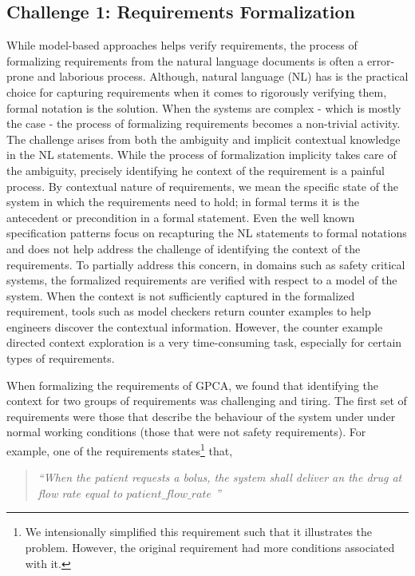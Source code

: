 \subsection{Challenge 1: Requirements Formalization}

While model-based approaches helps verify requirements, the process of formalizing requirements from the natural language documents is often a error-prone and laborious process. Although, natural language (NL) has is the practical choice for capturing requirements when it comes to rigorously verifying them, formal notation is the solution. When the systems are complex - which is mostly the case - the process of formalizing requirements becomes a non-trivial activity. The challenge arises from both the ambiguity and implicit contextual knowledge in the NL statements. While the process of formalization implicity takes care of the ambiguity, precisely identifying he context of the requirement is a painful process. By contextual nature of requirements, we mean the specific state of the system in which the requirements need to hold; in formal terms it is the antecedent or precondition in a formal statement. Even the well known specification patterns focus on recapturing the NL statements to formal notations and does not help address the challenge of identifying the context of the requirements. To partially address this concern, in domains such as safety critical systems, the formalized requirements are verified with respect to a model of the system. When the context is not sufficiently captured in the formalized requirement, tools such as model checkers return counter examples to help engineers discover the contextual information. However, the counter example directed context exploration is a very time-consuming task, especially for certain types of requirements.

When formalizing the requirements of GPCA, we found that identifying the context for two groups of requirements was challenging and tiring. The first set of requirements were those that describe the behaviour of the system under under normal working conditions (those that were not safety requirements). For example, one of the requirements states\footnote{\scriptsize{We intensionally simplified this requirement such that it illustrates the problem. However, the original requirement had more conditions associated with it.}} that,

\begin{quotation}
\emph{``When the patient requests a bolus, the system shall deliver an the drug at flow rate equal to $patient\_flow\_rate$ ''}
\end{quotation}

